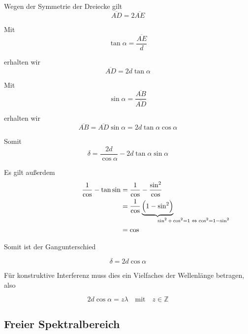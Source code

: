\documentclass[a4paper,german,12pt,smallheadings]{scrartcl}
\begin{document}
Wegen der Symmetrie der Dreiecke gilt
\begin{equation}
  \overline{AD} = 2 \overline{AE}
\end{equation}

Mit
\begin{equation}
  \tan \alpha = \frac{\overline{AE}}{d}
\end{equation}

erhalten wir
\begin{equation}
  \overline{AD} = 2 d \tan \alpha
\end{equation}

Mit
\begin{equation}
  \sin \alpha = \frac{\overline{AB}}{\overline{AD}}
\end{equation}

erhalten wir
\begin{equation}
  \overline{AB} = \overline{AD} \sin \alpha = 2d \tan \alpha \cos \alpha
\end{equation}

Somit
\begin{equation}
  \delta = \frac{2d}{\cos \alpha} - 2d \tan \alpha \sin \alpha
\end{equation}

Es gilt außerdem
\begin{align*}
  \frac{1}{\cos} - \tan \sin &= \frac{1}{\cos} - \frac{\sin^2}{\cos} \\
                             &= \frac{1}{\cos} \underbrace{\del{1-\sin^2}}_{\mathrlap{\sin^2 + \cos^2 = 1 \; \Leftrightarrow \; \cos^2 = 1 - \sin^2}} \\
                             &= \cos
\end{align*}

Somit ist der Gangunterschied

\begin{equation}
  \delta = 2d \cos \alpha
\end{equation}

Für konstruktive Interferenz muss dies ein Vielfaches der Wellenlänge betragen,
also

\begin{equation}
  2d \cos \alpha = z \lambda \quad \text{mit} \quad z \in \mathbb{Z}
\end{equation}

\subsection{Freier Spektralbereich}
\end{document}
